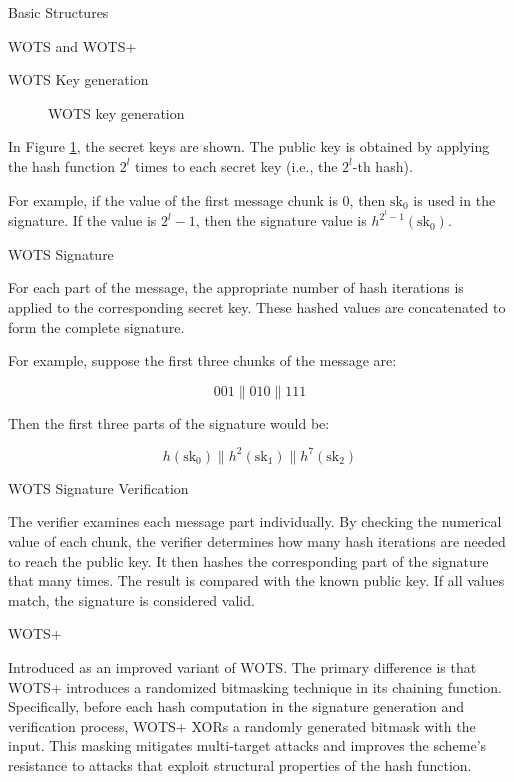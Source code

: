 \documentclass [version=submission]{iacrcc}
\begin{document}
\begin{section}{Basic Structures}{\label{sec1}}
\begin{subsection}{WOTS and WOTS+}
\begin{subsubsection}{WOTS Key generation}
\begin{figure}
\begin{tikzpicture}
        \end{tikzpicture}
            \caption{WOTS key generation}
            \label{fig:WOTS}
        \end{figure}

        In Figure \ref{fig:WOTS}, the secret keys are shown. The public key is obtained by applying the hash function \( 2^l \) times to each secret key (i.e., the \( 2^l \)-th hash). 

        For example, if the value of the first message chunk is 0, then \(\text{sk}_0\) is used in the signature. If the value is \( 2^l - 1 \), then the signature value is \( h^{2^l - 1}(\text{sk}_0) \).

        
    \end{subsubsection}

    \begin{subsubsection}{WOTS Signature}

        For each part of the message, the appropriate number of hash iterations is applied to the corresponding secret key. These hashed values are concatenated to form the complete signature.

        For example, suppose the first three chunks of the message are:
        
        \[
        001 \| 010 \| 111
        \]
        
        Then the first three parts of the signature would be:
        
        \[
        h(\text{sk}_0) \| h^2(\text{sk}_1) \| h^7(\text{sk}_2)
        \]
                
    \end{subsubsection}

    \begin{subsubsection}{WOTS Signature Verification}

        The verifier examines each message part individually. By checking the numerical value of each chunk, the verifier determines how many hash iterations are needed to reach the public key. It then hashes the corresponding part of the signature that many times. The result is compared with the known public key. If all values match, the signature is considered valid.
        
    \end{subsubsection}

    \begin{subsubsection}{WOTS+ \cite{cryptoeprint:2017/965}}

        Introduced as an improved variant of WOTS. The primary difference is that WOTS+ introduces a randomized bitmasking technique in its chaining function. Specifically, before each hash computation in the signature generation and verification process, WOTS+ XORs a randomly generated bitmask with the input. This masking mitigates multi-target attacks and improves the scheme’s resistance to attacks that exploit structural properties of the hash function. 
        

\end{subsubsection}
\end{subsection}
\end{section}
\end{document}
